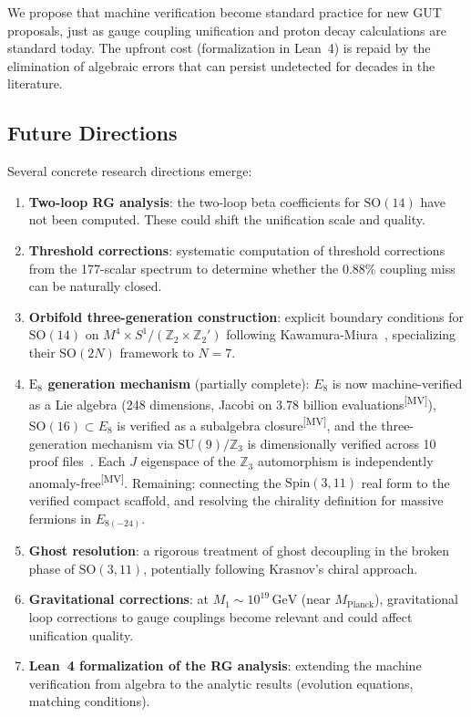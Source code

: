 \documentclass[aps,prd,twocolumn,showpacs,preprintnumbers,superscriptaddress,floatfix]{revtex4-2}
\newcommand{\GeV}{\,\mathrm{GeV}}
\newcommand{\MV}{\textsuperscript{[MV]}}
\begin{document}
We propose that machine verification become standard practice for new
GUT proposals, just as gauge coupling unification and proton decay
calculations are standard today.  The upfront cost (formalization in
Lean~4) is repaid by the elimination of algebraic errors that can
persist undetected for decades in the literature.

\subsection{Future Directions}

Several concrete research directions emerge:

\begin{enumerate}
\item \textbf{Two-loop RG analysis}: the two-loop beta coefficients
  for $\mathrm{SO}(14)$ have not been computed.  These could shift
  the unification scale and quality.
\item \textbf{Threshold corrections}: systematic computation of
  threshold corrections from the 177-scalar spectrum to determine
  whether the 0.88\% coupling miss can be naturally closed.
\item \textbf{Orbifold three-generation construction}:
  explicit boundary conditions for $\mathrm{SO}(14)$ on
  $M^4 \times S^1/(\mathbb{Z}_2 \times \mathbb{Z}_2')$
  following Kawamura-Miura~\cite{kawamura2010}, specializing their
  $\mathrm{SO}(2N)$ framework to $N = 7$.
\item \textbf{$\mathrm{E}_8$ generation mechanism} (partially complete):
  $E_8$ is now machine-verified as a Lie algebra (248 dimensions,
  Jacobi on 3.78 billion evaluations\MV), $\mathrm{SO}(16) \subset E_8$
  is verified as a subalgebra closure\MV, and the three-generation
  mechanism via $\mathrm{SU}(9)/\mathbb{Z}_3$ is dimensionally
  verified across 10 proof files~\cite{arnoldy2026prl}.  Each
  $J$ eigenspace of the $\mathbb{Z}_3$ automorphism is independently
  anomaly-free\MV.
  Remaining: connecting the $\mathrm{Spin}(3,11)$ real form to the
  verified compact scaffold, and resolving the chirality
  definition for massive fermions in $E_{8(-24)}$.
\item \textbf{Ghost resolution}: a rigorous treatment of ghost
  decoupling in the broken phase of $\mathrm{SO}(3,11)$, potentially
  following Krasnov's chiral approach.
\item \textbf{Gravitational corrections}: at $M_1 \sim 10^{19}\GeV$
  (near $M_\text{Planck}$), gravitational loop corrections to
  gauge couplings become relevant and could affect unification quality.
\item \textbf{Lean~4 formalization of the RG analysis}: extending
  the machine verification from algebra to the analytic results
  (evolution equations, matching conditions).
\end{enumerate}
\end{document}
